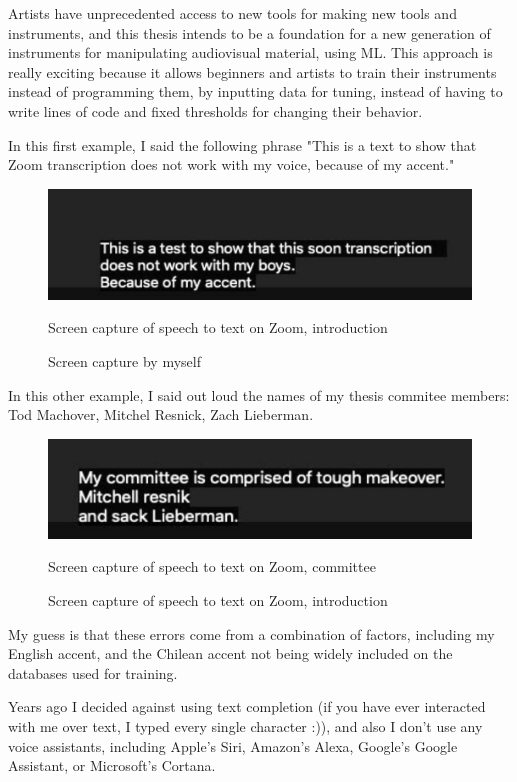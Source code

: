 Artists have unprecedented access to new tools for making new tools and instruments, and this thesis intends to be a foundation for a new generation of instruments for manipulating audiovisual material, using \acrshort{ML}. This approach is really exciting because it allows beginners and artists to train their instruments instead of programming them, by inputting data for tuning, instead of having to write lines of code and fixed thresholds for changing their behavior.

In this first example, I said the following phrase "This is a text to show that Zoom transcription does not work with my voice, because of my accent."

\begin{figure}[ht]
  \centering
  \includegraphics[width=0.75\linewidth,height=0.25\textheight,keepaspectratio]{images/zoom-introduction.jpg}
  \caption{Screen capture of speech to text on Zoom, introduction}
  \caption*{Screen capture by myself}
  \label{fig:zoom-voice}
\end{figure}

In this other example, I said out loud the names of my thesis commitee members: Tod Machover, Mitchel Resnick, Zach Lieberman.

\begin{figure}[ht]
  \centering
  \includegraphics[width=0.75\linewidth,height=0.25\textheight,keepaspectratio]{images/zoom-commitee.jpg}
  \caption{Screen capture of speech to text on Zoom, committee}
  \caption*{Screen capture of speech to text on Zoom, introduction}
  \label{fig:zoom-committee}
\end{figure}

My guess is that these errors come from a combination of factors, including my English accent, and the Chilean accent not being widely included on the databases used for training.

Years ago I decided against using text completion (if you have ever interacted with me over text, I typed every single character :)), and also I don't use any voice assistants, including Apple's Siri, Amazon's Alexa,  Google's Google Assistant, or Microsoft's Cortana.

